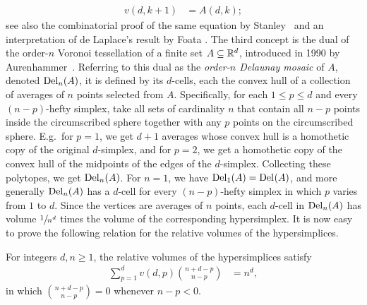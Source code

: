 \documentclass[a4paper,UKenglish,cleveref, autoref,numberwithinsect]{socg-lipics-v2021}
\newcommand {\mm}[1] {\ifmmode{#1}\else{\mbox{\(#1\)}}\fi}
\theoremstyle{plain}
\newcommand{\Rspace}        {\mm{{\mathbb R}}}
\newcommand{\Delaunay}[2]   {\mm{{\rm Del}_{#1}{({#2})}}}
\begin{document}
\begin{align}
  v(d,k+1) &= A(d,k) ;
  \label{eqn:Laplace_relation}
\end{align}
see also the combinatorial proof of the same equation by Stanley~\cite{Sta77} and an interpretation of de Laplace's result by Foata \cite{Foa77}.
The third concept is the dual of the order-$n$ Voronoi tessellation of a finite set $A \subseteq \Rspace^d$, introduced in 1990 by Aurenhammer~\cite{Aur90}.
Referring to this dual as the \emph{order-$n$ Delaunay mosaic} of $A$, denoted $\Delaunay{n}{A}$, it is defined by its $d$-cells, each the convex hull of a collection of averages of $n$ points selected from $A$.
Specifically, for each $1 \leq p \leq d$ and every $(n-p)$-hefty simplex, take all sets of cardinality $n$ that contain all $n-p$ points inside the circumscribed sphere together with any $p$ points on the circumscribed sphere.
E.g.\ for $p=1$, we get $d+1$ averages whose convex hull is a homothetic copy of the original $d$-simplex, and for $p=2$, we get a homothetic copy of the convex hull of the midpoints of the edges of the $d$-simplex.
Collecting these polytopes, we get $\Delaunay{n}{A}$.
For $n=1$, we have $\Delaunay{1}{A} = \Delaunay{}{A}$, and more generally $\Delaunay{n}{A}$ has a $d$-cell for every $(n-p)$-hefty simplex in which $p$ varies from $1$ to $d$.
Since the vertices are averages of $n$ points, each $d$-cell in $\Delaunay{n}{A}$ has volume $\sfrac{1}{n^d}$ times the volume of the corresponding hypersimplex.
It is now easy to prove the following relation for the relative volumes of the hypersimplices.
\begin{theorem}
  \label{thm:hypersimplex_identity}
  For integers $d, n \geq 1$,
  the relative volumes of the hypersimplices satisfy
  \begin{align}
    \sum\nolimits_{p=1}^{d} v(d,p) \binom{n+d-p}{n-p} &= n^d ,
    \label{eqn:hypersimplex_identity}
  \end{align}
  in which $\binom{n+d-p}{n-p} = 0$ whenever $n-p < 0$.
\end{theorem}
\end{document}
